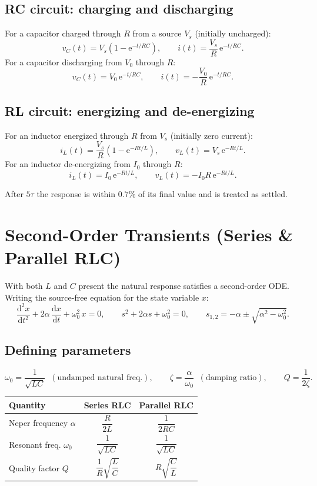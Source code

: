 \documentclass[11pt,a4paper]{article}
\newcommand{\dd}{\mathrm{d}}
\newcommand{\ee}{\mathrm{e}}
\begin{document}
\subsection{RC circuit: charging and discharging}
For a capacitor charged through $R$ from a source $V_s$ (initially uncharged):
\[
  v_C(t) = V_s\!\left(1-\ee^{-t/RC}\right), \qquad
  i(t) = \frac{V_s}{R}\,\ee^{-t/RC}.
\]
For a capacitor discharging from $V_0$ through $R$:
\[
  v_C(t) = V_0\,\ee^{-t/RC}, \qquad
  i(t) = -\frac{V_0}{R}\,\ee^{-t/RC}.
\]

\subsection{RL circuit: energizing and de-energizing}
For an inductor energized through $R$ from $V_s$ (initially zero current):
\[
  i_L(t) = \frac{V_s}{R}\!\left(1-\ee^{-Rt/L}\right), \qquad
  v_L(t) = V_s\,\ee^{-Rt/L}.
\]
For an inductor de-energizing from $I_0$ through $R$:
\[
  i_L(t) = I_0\,\ee^{-Rt/L}, \qquad
  v_L(t) = -I_0 R\,\ee^{-Rt/L}.
\]

After $5\tau$ the response is within $0.7\%$ of its final value and is treated
as settled.

\section{Second-Order Transients (Series \& Parallel RLC)}

With both $L$ and $C$ present the natural response satisfies a second-order
ODE. Writing the source-free equation for the state variable $x$:
\[
  \frac{\dd^2 x}{\dd t^2} + 2\alpha\,\frac{\dd x}{\dd t} + \omega_0^2\,x = 0,
  \qquad
  s^2 + 2\alpha s + \omega_0^2 = 0,
  \qquad
  s_{1,2} = -\alpha \pm \sqrt{\alpha^2 - \omega_0^2}.
\]

\subsection{Defining parameters}
\[
  \omega_0 = \frac{1}{\sqrt{LC}} \;\;(\text{undamped natural freq.}),
  \qquad
  \zeta = \frac{\alpha}{\omega_0} \;\;(\text{damping ratio}),
  \qquad
  Q = \frac{1}{2\zeta}.
\]
\begin{center}
\begin{tabular}{@{}lcc@{}}
\hline
\textbf{Quantity} & \textbf{Series RLC} & \textbf{Parallel RLC}\\
\hline
Neper frequency $\alpha$ & $\dfrac{R}{2L}$ & $\dfrac{1}{2RC}$\\
Resonant freq. $\omega_0$ & $\dfrac{1}{\sqrt{LC}}$ & $\dfrac{1}{\sqrt{LC}}$\\
Quality factor $Q$ & $\dfrac{1}{R}\sqrt{\dfrac{L}{C}}$ & $R\sqrt{\dfrac{C}{L}}$\\
\hline
\end{tabular}
\end{center}
\end{document}
